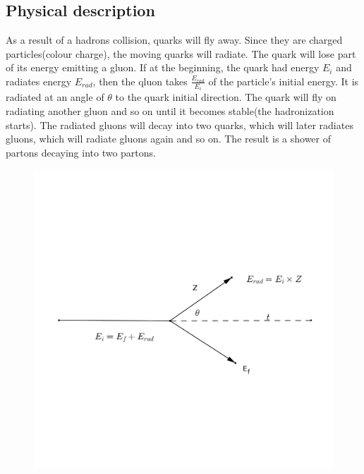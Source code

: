 \subsection{Physical description}
\noindent As a result of a hadrons collision, quarks will fly away. Since they are charged particles(colour charge), the moving quarks will radiate. The quark will lose part of its energy emitting a gluon. If at the beginning, the quark had energy $E_i$ and radiates energy $E_{rad}$, then the qluon takes $\frac{E_{rad}}{E_i}$ of the particle's initial energy.
It is radiated at an angle of $\theta$ to the quark initial direction. The quark will fly on radiating another gluon and so on until it becomes stable(the hadronization starts).
The radiated gluons will decay into two quarks, which will later radiates gluons,  which will radiate gluons again and so on. The result is a shower of partons decaying into two partons. 
\begin{figure}[hbtp]
\centering
\includegraphics[scale=.15]{images/tt.png}
\end{figure}



